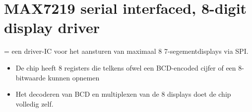 \documentclass{article}
\begin{document}
\section{MAX7219 serial interfaced, 8-digit display driver}
= een driver-IC voor het aansturen van maximaal 8 7-segementdisplays via SPI. 

\begin{itemize}
    \item De chip heeft 8 registers die telkens ofwel een BCD-encoded cijfer of een 8-bitwaarde kunnen opnemen
    \item Het decoderen van BCD en multiplexen van de 8 displays doet de chip volledig zelf.
\end{itemize}
\end{document}
